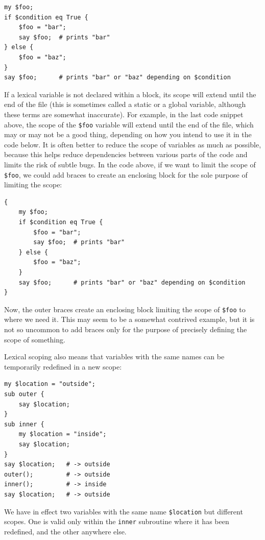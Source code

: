 \begin{verbatim}
my $foo;
if $condition eq True {
    $foo = "bar";
    say $foo;  # prints "bar"
} else {
    $foo = "baz";
}
say $foo;      # prints "bar" or "baz" depending on $condition
\end{verbatim}
%
If a lexical variable is not declared within a block, its 
scope will extend until the end of the file (this is sometimes 
called a static or a global variable, although these terms are 
somewhat inaccurate). For example, in the last code snippet 
above, the scope of the {\tt \$foo} variable will extend 
until the end of the file, which may or may not be a good thing, 
depending on how you intend to use it in the code below. It 
is often better to reduce the scope of variables as much as 
possible, because this helps reduce dependencies between 
various parts of the code and limits 
the risk of subtle bugs. In the code above, if we want to 
limit the scope of {\tt \$foo}, we could add braces to create 
an enclosing block for the sole purpose of limiting the scope:
\begin{verbatim}
{
    my $foo;
    if $condition eq True {
        $foo = "bar";
        say $foo;  # prints "bar"
    } else {
        $foo = "baz";
    }
    say $foo;      # prints "bar" or "baz" depending on $condition
}
\end{verbatim}
% 
Now, the outer braces create an enclosing block limiting the 
scope of {\tt \$foo} to where we need it. This may seem to be a 
somewhat contrived example, but it is not so uncommon to add 
braces only for the purpose of precisely defining the scope 
of something.

Lexical scoping also means that variables with the same names
can be temporarily redefined in a new scope: 

\begin{verbatim}
my $location = "outside";
sub outer {
    say $location;
}
sub inner {
    my $location = "inside";
    say $location;
}
say $location;   # -> outside
outer();         # -> outside
inner();         # -> inside
say $location;   # -> outside
\end{verbatim}
% 
We have in effect two variables with the same name 
{\tt \$location} but different scopes. One is valid only 
within the {\tt inner} subroutine where it has been redefined, 
and the other anywhere else.

